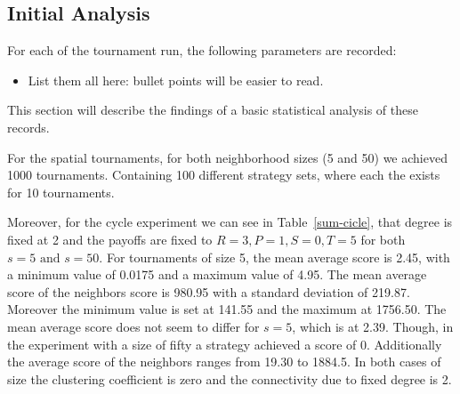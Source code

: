 
\subsection{Initial Analysis}

For each of the tournament run, the following parameters are recorded:

\begin{itemize}
    \item List them all here: bullet points will be easier to read.
\end{itemize}

This section will describe the findings of a basic statistical analysis of these
records.

For the spatial tournaments, for both neighborhood sizes (5 and 50)
we achieved 1000 tournaments. Containing 100 different strategy sets, where each
the exists for 10 tournaments.

Moreover, for the cycle experiment we can see in Table~\ref{sum-cicle}, that degree is
fixed at 2 and the payoffs are fixed to \(R=3, P=1, S=0, T=5\) for both
\( s=5\textrm{ and } s=50 \). For tournaments of size 5, the mean average score
is 2.45, with a minimum value of 0.0175 and a maximum value of 4.95. The
mean average score of the neighbors score is 980.95 with a standard deviation
of 219.87. Moreover the minimum value is set at 141.55 and the maximum at
1756.50. The mean average score does not seem to differ for \(s=5\),
which is at 2.39. Though, in the experiment with a size of fifty a strategy
achieved a score of 0. Additionally the average score of the neighbors ranges
from 19.30 to 1884.5. In both cases of size the clustering coefficient is zero
and the connectivity due to fixed degree is 2.

